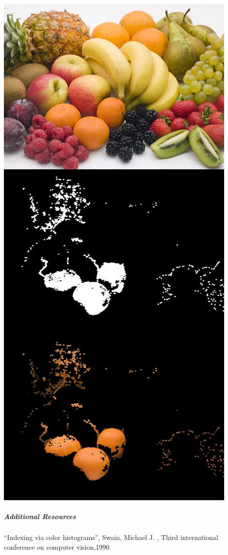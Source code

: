 \documentclass[11pt]{article}
\makeatletter
\def\maxwidth{\ifdim\Gin@nat@width>\linewidth\linewidth
    \else\Gin@nat@width\fi}
\let\Oldincludegraphics\includegraphics
\renewcommand{\includegraphics}[1]{\Oldincludegraphics[width=.8\maxwidth]{#1}}
\makeatother
\begin{document}
    \includegraphics{res.jpg}

\hypertarget{additional-resources}{%
\subparagraph{Additional Resources}\label{additional-resources}}

``Indexing via color histograms'', Swain, Michael J. , Third
international conference on computer vision,1990.


    
    
    
    
\end{document}
